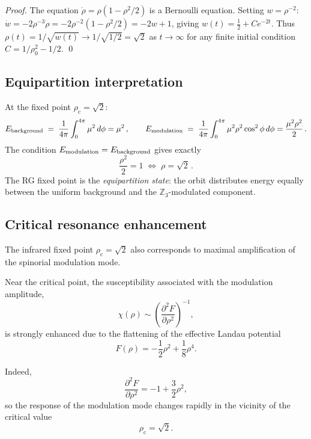 \documentclass[12pt,a4paper]{article}
\theoremstyle{definition}
\newcommand{\rhoc}{\rho_{\mathrm{c}}}
\begin{document}
\begin{proof}
The equation $\dot\rho = \rho(1-\rho^2/2)$ is a Bernoulli equation.
Setting $w = \rho^{-2}$:
$\dot w = -2\rho^{-3}\dot\rho = -2\rho^{-2}(1-\rho^2/2) = -2w + 1$,
giving $w(t) = \tfrac{1}{2} + Ce^{-2t}$.
Thus $\rho(t) = 1/\sqrt{w(t)} \to 1/\sqrt{1/2} = \sqrt{2}$ as $t\to\infty$
for any finite initial condition $C = 1/\rho_0^2 - 1/2$.
\qed
\end{proof}

\subsection{Equipartition interpretation}

At the fixed point $\rhoc = \sqrt{2}$:
\begin{equation}
  E_{\rm background} \;=\; \frac{1}{4\pi}\int_0^{4\pi}\mu^2\,d\phi = \mu^2\,,
  \qquad
  E_{\rm modulation} \;=\; \frac{1}{4\pi}\int_0^{4\pi}\mu^2\rho^2\cos^2\phi\,d\phi
  = \frac{\mu^2\rho^2}{2}\,.
\end{equation}
The condition $E_{\rm modulation} = E_{\rm background}$ gives exactly
\begin{equation}
  \frac{\rho^2}{2} = 1 \;\Longleftrightarrow\; \rho = \sqrt{2}\,.
\end{equation}
The RG fixed point is the \emph{equipartition state}: the orbit distributes energy
equally between the uniform background and the $\mathbb{Z}_3$-modulated component.

\subsection{Critical resonance enhancement}
\label{sec:resonance}

The infrared fixed point $\rho_{\mathrm c}=\sqrt2$
also corresponds to maximal amplification of the
spinorial modulation mode.

Near the critical point, the susceptibility associated with
the modulation amplitude,
\[
\chi(\rho)
\sim
\left(
\frac{\partial^2 F}{\partial \rho^2}
\right)^{-1},
\]
is strongly enhanced due to the flattening of the effective
Landau potential
\[
F(\rho)
=
-\frac12\rho^2+\frac18\rho^4.
\]

Indeed,
\[
\frac{\partial^2 F}{\partial\rho^2}
=
-1+\frac{3}{2}\rho^2,
\]
so the response of the modulation mode changes rapidly in the
vicinity of the critical value
\[
\rho_{\mathrm c}=\sqrt2.
\]
\end{document}
